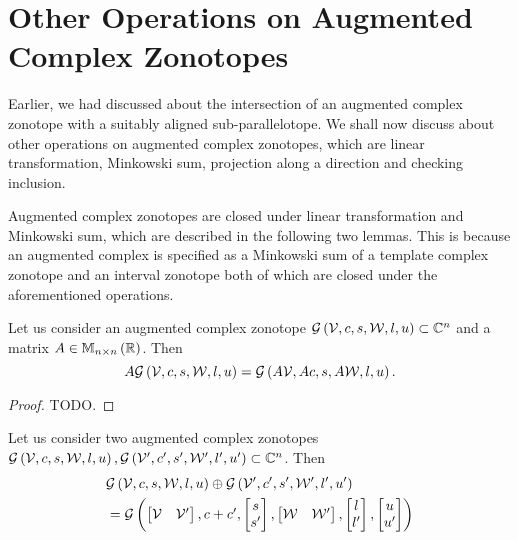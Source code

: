 \section{Other Operations on Augmented Complex Zonotopes}
Earlier, we had discussed about the intersection of an augmented
complex zonotope with a suitably aligned sub-parallelotope.  We shall
now discuss about other operations on augmented complex zonotopes, which
are linear transformation, Minkowski sum, projection along a direction
and checking inclusion.

Augmented complex zonotopes are closed under linear transformation and
Minkowski sum, which are described in the following two lemmas.  This
is because an augmented complex is specified as a Minkowski sum of a template
complex zonotope and an interval zonotope both of which are closed
under the aforementioned operations.
%
\begin{lemma}
Let us consider an augmented complex zonotope
$\mathcal{G}\left(\mathcal{V},c,s,\mathcal{W},l,u\right)\subset \mathbb{C}^n$
and a matrix $A\in\mathbb{M}_{n\times n}\left(\mathbb{R}\right)$.  Then
%
\[
A\mathcal{G}\left(\mathcal{V},c,s,\mathcal{W},l,u\right)=\mathcal{G}\left(A\mathcal{V},Ac,s,A\mathcal{W},l,u\right).
\]
%
\end{lemma}
%
\begin{proof}
{\color{red} TODO}.
\end{proof}
%
\begin{lemma}
Let us consider two augmented complex zonotopes
$\mathcal{G}\left(\mathcal{V},c,s,\mathcal{W},l,u\right),
\mathcal{G}\left(\mathcal{V}^\prime,c^\prime,s^\prime,\mathcal{W}^\prime,l^\prime,u^\prime\right)\subset\mathbb{C}^n$.
Then
%
\begin{align*}
& \mathcal{G}\left(\mathcal{V},c,s,\mathcal{W},l,u\right)\oplus \mathcal{G}\left(\mathcal{V}^\prime,c^\prime,s^\prime,\mathcal{W}^\prime,l^\prime,u^\prime\right)\\
& = \mathcal{G}\left(\left[\begin{matrix}
    \mathcal{V} &
    \mathcal{V}^\prime
  \end{matrix}\right]
,\begin{matrix}
    c+c^\prime
  \end{matrix}
,\left[\begin{matrix}
    s\\
    s^\prime
  \end{matrix}\right]
,\left[\begin{matrix}
    \mathcal{W} &
    \mathcal{W}^\prime
  \end{matrix}\right]
,\left[\begin{matrix}
    l\\
    l^\prime
  \end{matrix}\right]
,\left[\begin{matrix}
    u\\
    u^\prime
  \end{matrix}\right]
\right)
\end{align*}
%
\end{lemma}
